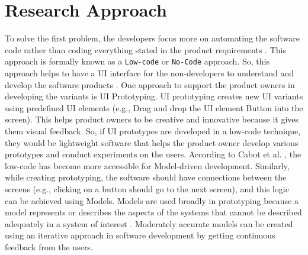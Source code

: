 \section{Research Approach} 
\label{intro:section:research}
To solve the first problem, the developers focus more on automating the software code rather than coding everything stated in the product requirements \cite{article:prototyping:hoffnagle}.
This approach is formally known as a \texttt{Low-code} or \texttt{No-Code} approach.
So, this approach helps to have a UI interface for the non-developers to understand and develop the software products \cite{paper:lowcode:khorram}.
One approach to support the product owners in developing the variants is UI Prototyping. 
UI prototyping creates new UI variants using predefined UI elements (e.g., Drag and drop the UI element Button into the screen).
This helps product owners to be creative and innovative because it gives them visual feedback.
So, if UI prototypes are developed in a low-code technique, they would be lightweight software that helps the product owner develop various prototypes and conduct experiments on the users.
According to Cabot et al. \cite{paper:lowcode:cabot}, the low-code has become more accessible for Model-driven development. 
Similarly, while creating prototyping, the software should have connections between the screens (e.g., clicking on a button should go to the next screen), and this logic can be achieved using Models.
Models are used broadly in prototyping because a model represents or describes the aspects of the systems that cannot be described adequately in a system of interest \cite{paper:prototyping:luqi}.
Moderately accurate models can be created using an iterative approach in software development by getting continuous feedback from the users.



